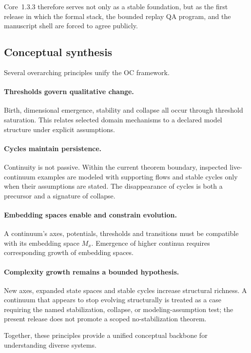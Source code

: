 Core~1.3.3 therefore serves not only as a stable foundation, but as the first
release in which the formal stack, the bounded replay QA program, and the
manuscript shell are forced to agree publicly.

\subsection{Conceptual synthesis}

Several overarching principles unify the OC framework.

\paragraph{Thresholds govern qualitative change.}
Birth, dimensional emergence, stability and collapse all occur through threshold saturation.
This relates selected domain mechanisms to a declared model structure under explicit assumptions.

\paragraph{Cycles maintain persistence.}
Continuity is not passive.
Within the current theorem boundary, inspected live-continuum examples are modeled with supporting flows and stable cycles only when their assumptions are stated.
The disappearance of cycles is both a precursor and a signature of collapse.

\paragraph{Embedding spaces enable and constrain evolution.}
A continuum’s axes, potentials, thresholds and transitions must be compatible with its embedding space \(M_x\).
Emergence of higher continua requires corresponding growth of embedding spaces.

\paragraph{Complexity growth remains a bounded hypothesis.}
New axes, expanded state spaces and stable cycles increase structural richness.
A continuum that appears to stop evolving structurally is treated as a case requiring the named stabilization, collapse, or modeling-assumption test; the present release does not promote a scoped no-stabilization theorem.

Together, these principles provide a unified conceptual backbone for understanding diverse systems.

